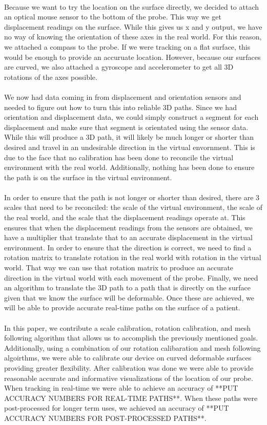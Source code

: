 \\
Because we want to try the location on the surface directly, we decided to attach an optical mouse sensor to the bottom of the probe. This way we get displacement readings on the surface. While this gives us x and y output, we have no way of knowing the orientation of these axes in the real world. For this reason, we attached a compass to the probe. If we were tracking on a flat surface, this would be enough to provide an accuruate location. However, because our surfaces are curved, we also attached a gyroscope and accelerometer to get all 3D rotations of the axes possible. \\
\\
We now had data coming in from displacement and orientation sensors and needed to figure out how to turn this into reliable 3D paths. Since we had orientation and displacement data, we could simply construct a segment for each displacement and make sure that segment is orientated using the sensor data. While this will produce a 3D path, it will likely be much longer or shorter than desired and travel in an undesirable direction in the virtual envornment. This is due to the face that no calibration has been done to reconcile the virtual environment with the real world. Additionally, nothing has been done to ensure the path is on the surface in the virtual environment.\\
\\
In order to ensure that the path is not longer or shorter than desired, there are 3 scales that need to be reconciled: the scale of the virtual environment, the scale of the real world, and the scale that the displacement readings operate at. This ensures that when the displacement readings from the sensors are obtained, we have a multiplier that translate that to an accurate displacement in the virtual environment. In order to ensure that the direction is correct, we need to find a rotation matrix to translate rotation in the real world with rotation in the virtual world. That way we can use that rotation matrix to produce an accurate direction in the virtual world with each movement of the probe. Finally, we need an algorithm to translate the 3D path to a path that is directly on the surface given that we know the surface will be deformable. Once these are achieved, we will be able to provide accurate real-time paths on the surface of a patient. \\
\\
In this paper, we contribute a scale calibration, rotation calibration, and mesh following algorithm that allows us to accomplish the previously mentioned goals. Additionally, using a combination of our rotation calibaration and mesh following algoirthms, we were able to calibrate our device on curved deformable surfaces providing greater flexibility. After calibration was done we were able to provide reasonable accurate and informative visualizations of the location of our probe. When tracking in real-time we were able to achieve an accuracy of **PUT ACCURACY NUMBERS FOR REAL-TIME PATHS**. When these paths were post-processed for longer term uses, we achieved an accuracy of **PUT ACCURACY NUMBERS FOR POST-PROCESSED PATHS**.  